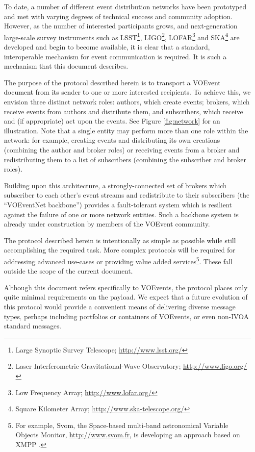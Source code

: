 \documentclass[a4paper,11pt]{ivoa}
\begin{document}
To date, a number of different event distribution networks have been
prototyped and met with varying degrees of technical success and community
adoption. However, as the number of interested participants grows, and
next-generation large-scale survey instruments such as LSST\footnote{Large
Synoptic Survey Telescope; \url{http://www.lsst.org/}}, LIGO\footnote{Laser
Interferometric Gravitational-Wave Observatory; \url{http://www.ligo.org/}},
LOFAR\footnote{Low Frequency Array; \url{http://www.lofar.org/}} and
SKA\footnote{Square Kilometer Array; \url{http://www.ska-telescope.org/}} are
developed and begin to become available, it is clear that a standard,
interoperable mechanism for event communication is required. It is such a
mechanism that this document describes.

The purpose of the protocol described herein is to transport a VOEvent
document from its sender to one or more interested recipients. To achieve
this, we envision three distinct network roles: authors, which create events;
brokers, which receive events from authors and distribute them, and
subscribers, which receive and (if appropriate) act upon the events. See
Figure \ref{fig:network} for an illustration. Note that a single entity may
perform more than one role within the network: for example, creating events
and distributing its own creations (combining the author and broker roles) or
receiving events from a broker and redistributing them to a list of
subscribers (combining the subscriber and broker roles).

Building upon this architecture, a strongly-connected set of brokers which
subscriber to each other's event streams and redistribute to their subscribers
(the ``VOEventNet backbone'') provides a fault-tolerant system which is
resilient against the failure of one or more network entities. Such a backbone
system is already under construction by members of the VOEvent community.

The protocol described herein is intentionally as simple as possible while
still accomplishing the required task. More complex protocols will be required
for addressing advanced use-cases or providing value added
services\footnote{For example, Svom, the Space-based multi-band astronomical
Variable Objects Monitor, \url{http://www.svom.fr}, is developing an approach
based on XMPP \citep{SaintAndre:2011}.}. These fall outside the scope of the
current document.

Although this document refers specifically to VOEvents, the protocol places
only quite minimal requirements on the payload. We expect that a future
evolution of this protocol would provide a convenient means of delivering
diverse message types, perhaps including portfolios or containers of VOEvents,
or even non-IVOA standard messages.
\end{document}

